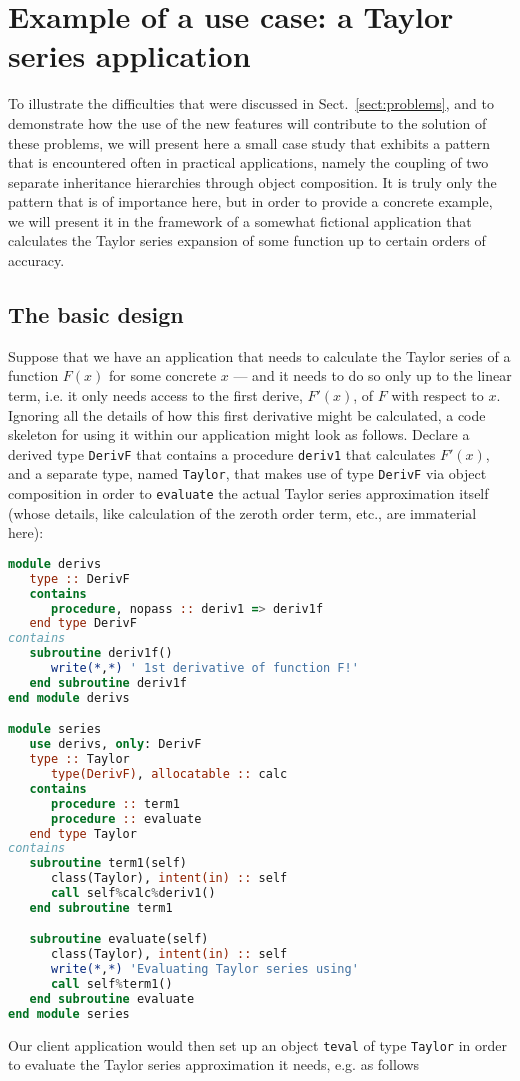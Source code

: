 \documentclass[11pt,oneside]{article}
\begin{document}
\section{Example of a use case: a Taylor series application}

To illustrate the difficulties that were discussed in
Sect.~\ref{sect:problems}, and to demonstrate how the use of the new
features will contribute to the solution of these problems, we will
present here a small case study that exhibits a pattern that is
encountered often in practical applications, namely the coupling of
two separate inheritance hierarchies through object composition. It is
truly only the pattern that is of importance here, but in order to
provide a concrete example, we will present it in the framework of a
somewhat fictional application that calculates the Taylor series
expansion of some function up to certain orders of accuracy.

\subsection{The basic design}
\label{sect:basic_design}

Suppose that we have an application that needs to calculate the Taylor
series of a function $F(x)$ for some concrete $x$ --- and it needs to
do so only up to the linear term, i.e. it only needs access to the
first derive, $F'(x)$, of $F$ with respect to $x$. Ignoring all the
details of how this first derivative might be calculated, a code
skeleton for using it within our application might look as
follows. Declare a derived type \texttt{DerivF} that contains a
procedure \texttt{deriv1} that calculates $F'(x)$, and a separate
type, named \texttt{Taylor}, that makes use of type \texttt{DerivF}
via object composition in order to \texttt{evaluate} the actual Taylor
series approximation itself (whose details, like calculation of the
zeroth order term, etc., are immaterial here):
\begin{lstlisting}[language=Fortran]
module derivs
   type :: DerivF
   contains
      procedure, nopass :: deriv1 => deriv1f
   end type DerivF
contains
   subroutine deriv1f()
      write(*,*) ' 1st derivative of function F!'
   end subroutine deriv1f
end module derivs

module series
   use derivs, only: DerivF
   type :: Taylor
      type(DerivF), allocatable :: calc
   contains
      procedure :: term1
      procedure :: evaluate
   end type Taylor
contains
   subroutine term1(self)
      class(Taylor), intent(in) :: self
      call self%calc%deriv1()
   end subroutine term1

   subroutine evaluate(self)
      class(Taylor), intent(in) :: self
      write(*,*) 'Evaluating Taylor series using'
      call self%term1()
   end subroutine evaluate   
end module series
\end{lstlisting}
Our client application would then set up an object \texttt{teval} of
type \texttt{Taylor} in order to evaluate the Taylor series
approximation it needs, e.g. as follows
\end{document}
